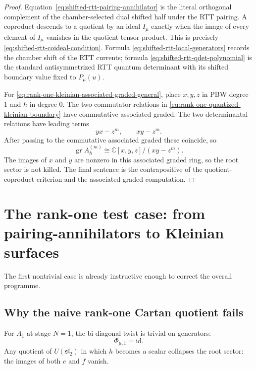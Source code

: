 \begin{proof}
Equation~\eqref{eq:shifted-rtt-pairing-annihilator} is the literal
orthogonal complement of the chamber-selected dual shifted half under
the RTT pairing. A coproduct descends to a quotient by an ideal \(I_\mu\)
exactly when the image of every element of \(I_\mu\) vanishes in the
quotient tensor product. This is precisely
\eqref{eq:shifted-rtt-coideal-condition}. Formula
\eqref{eq:shifted-rtt-local-generators} records the chamber shift of the
RTT currents; formula \eqref{eq:shifted-rtt-qdet-polynomial} is the
standard antisymmetrized RTT quantum determinant with its shifted
boundary value fixed to \(P_\mu(u)\).

For \eqref{eq:rank-one-kleinian-associated-graded-general}, place
\(x,y,z\) in PBW degree \(1\) and \(\hbar\) in degree \(0\). The two
commutator relations in \eqref{eq:rank-one-quantized-kleinian-boundary}
have commutative associated graded. The two determinantal relations have
leading terms
\[
yx-z^m,
\qquad
xy-z^m.
\]
After passing to the commutative associated graded these coincide, so
\[
\operatorname{gr}A_{\hbar}^{(m)}
\cong
\mathbb C[x,y,z]/(xy-z^m).
\]
The images of \(x\) and \(y\) are nonzero in this associated graded
ring, so the root sector is not killed. The final sentence is the
contrapositive of the quotient-coproduct criterion and the associated
graded computation.
\end{proof}

\section{The rank-one test case: from pairing-annihilators to Kleinian surfaces}
\label{sec:rank-one-test-case}

The first nontrivial case is already instructive enough to correct the overall
programme.

\subsection{Why the naive rank-one Cartan quotient fails}

\begin{proposition}[Stage $N=1$ twist is trivial; naive Cartan fixing collapses the root sector \ClaimStatusProvedHere]
\label{prop:stage-one-cartan-collapse-appendix}
For $A_1$ at stage $N=1$, the bi-diagonal twist is trivial on generators:
\[
\Phi_{\mu,1}=\mathrm{id}.
\]
Any quotient of $U(\mathfrak{sl}_2)$ in which $h$ becomes a scalar
collapses the root sector: the images of both $e$ and $f$ vanish.
\end{proposition}

